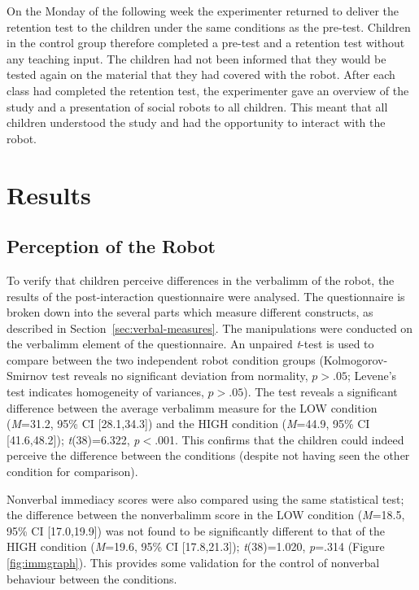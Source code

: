 On the Monday of the following week the experimenter returned to deliver the retention test to the children under the same conditions as the pre-test. Children in the control group therefore completed a pre-test and a retention test without any teaching input. The children had not been informed that they would be tested again on the material that they had covered with the robot. After each class had completed the retention test, the experimenter gave an overview of the study and a presentation of social robots to all children. This meant that all children understood the study and had the opportunity to interact with the robot.

\section{Results} \label{sec:verbal-results}
\subsection{Perception of the Robot}\label{sec:verbal-res-perc}
To verify that children perceive differences in the \gls{verbalimm} of the robot, the results of the post-interaction questionnaire were analysed. The questionnaire is broken down into the several parts which measure different constructs, as described in Section~\ref{sec:verbal-measures}. The manipulations were conducted on the \gls{verbalimm} element of the questionnaire. An unpaired \textit{t}-test is used to compare between the two independent robot condition groups (Kolmogorov-Smirnov test reveals no significant deviation from normality, $\textit{p}>.05$; Levene's test indicates homogeneity of variances, $\textit{p}>.05$). The test reveals a significant difference between the average \gls{verbalimm} measure for the LOW condition (\textit{M}=31.2, 95\% CI [28.1,34.3]) and the HIGH condition (\textit{M}=44.9, 95\% CI [41.6,48.2]); \textit{t}(38)=6.322, \textit{p}$<$.001. This confirms that the children could indeed perceive the difference between the conditions (despite not having seen the other condition for comparison).

Nonverbal immediacy scores were also compared using the same statistical test; the difference between the \gls{nonverbalimm} score in the LOW condition (\textit{M}=18.5, 95\% CI [17.0,19.9]) was not found to be significantly different to that of the HIGH condition (\textit{M}=19.6, 95\% CI [17.8,21.3]); \textit{t}(38)=1.020, \textit{p}=.314 (Figure \ref{fig:immgraph}). This provides some validation for the control of nonverbal behaviour between the conditions.

